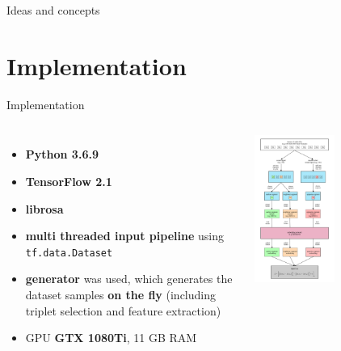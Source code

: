 \documentclass[aspectratio=169, professionalfonts]{beamer}
\begin{document}
\begin{frame}{Ideas and concepts}
\end{frame}


\section{Implementation}

\begin{frame}{Implementation}
    \begin{columns}[T]
            \begin{itemize}
        		\item \textbf{Python 3.6.9}
        		\item \textbf{TensorFlow 2.1}
        		\item \textbf{librosa}
        		\item \textbf{multi threaded input pipeline} using \texttt{tf.data.Dataset}
        		\item \textbf{generator} was used, which generates the dataset samples \textbf{on the fly} (including triplet selection and feature extraction)
        		\item GPU \textbf{GTX 1080Ti}, 11 GB RAM
        	\end{itemize}
        
            \centering
            \includegraphics[width=0.5\textwidth,keepaspectratio]{images/Input_Pipeline_Visualisation.png}
    \end{columns}
    

\end{frame}
\end{document}
